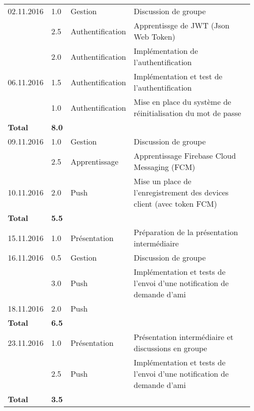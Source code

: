 \documentclass[french]{article}
\begin{document}
\begin{longtable}{p{}|p{}|p{}|p{}}
		\hline
		02.11.2016 & 1.0 & Gestion & Discussion de groupe \\
			       & 2.5 & Authentification & Apprentissge de JWT (Json Web Token) \\
  			       & 2.0 & Authentification & Implémentation de l'authentification \\
		06.11.2016 & 1.5 & Authentification & Implémentation et test de l'authentification \\
				   & 1.0 & Authentification & Mise en place du système de réinitialisation du mot de passe \\
		\textbf{Total} & \textbf{8.0} && \\
		
		\hline
		09.11.2016 & 1.0 & Gestion & Discussion de groupe \\
		           & 2.5 & Apprentissage & Apprentissage Firebase Cloud Messaging (FCM) \\
		10.11.2016 & 2.0 & Push & Mise un place de l'enregistrement des devices client (avec token FCM) \\
		\textbf{Total} & \textbf{5.5} && \\
		
		\hline
		15.11.2016 & 1.0 & Présentation & Préparation de la présentation intermédiaire \\
		16.11.2016 & 0.5 & Gestion & Discussion de groupe \\
				   & 3.0 & Push & Implémentation et tests de l'envoi d'une notification de demande d'ami \\
		18.11.2016 & 2.0 & Push & \\
		\textbf{Total} & \textbf{6.5} && \\
		
		\hline
		23.11.2016 & 1.0 & Présentation & Présentation intermédiaire et discussions en groupe \\
		           & 2.5 & Push & Implémentation et tests de l'envoi d'une notification de demande d'ami \\

		\textbf{Total} & \textbf{3.5} && \\
		
		\hline
	\end{longtable}
	
\end{document}
